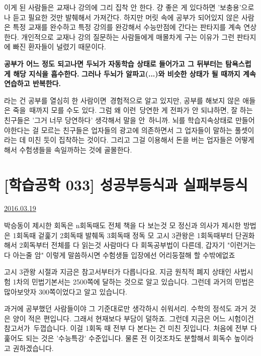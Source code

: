 이게 된 사람들은 교재나 강의에 그리 집착 안 한다. 걍 좋은 게 있다하면 '보충용'으로나 듣고 필요한 것만 발췌해서 가져간다.
하지만 머릿 속에 공부가 되어있지 않은 사람은 특정 교재를 완수하고 특정 강의를 완강해서 수능만점에 간다는 판타지를 계속 연상한다.
개인적으로 교재나 강의 질문하는 사람들에게 매몰차게 구는 이유가 그런 판타지에 빠진 환자들이 널렸기 때문이다.
\vspace{5mm}

\textbf{공부가 어느 정도 되고나면 두뇌가 자동학습 상태로 들어가고 그 뒤부터는 탐욕스럽게 해당 지식을 흡수한다.}
\textbf{그러나 두뇌가 알파고(...)와 비슷한 상태가 될 때까지 계속 연습하고 반복한다.}
\vspace{5mm}

라는 건 공부를 열심히 한 사람이면 경험적으로 알고 있지만, 공부를 해보지 않은 애들은 죽을 때까지 모를 수도 있다.
그럼 왜 이런 당연한 게 전파가 안 되냐하면, 잘 하는 친구들은 '그거 너무 당연하다' 생각해서 말을 안 하니까.
뇌를 학습지속상태로 만들어야한다는 걸 모르는 친구들은
업자들의 광고에 의존하면서 그 업자들이 말하는 풀셋이라는 데 미친 듯이 집착하는 것이다.
그리고 그걸 이용해서 돈을 버는 업자들은 어떻게 해서 수험생들을 속일까하는 것에 골몰한다.
\vspace{5mm}




\section{[학습공학 033] 성공부등식과 실패부등식}
\href{https://www.kockoc.com/Apoc/683846}{2016.03.19}

\vspace{5mm}

박승동이 제시한 회독은 n회독때도 전체 책을 다 보는것 모 정신과 의사가 제시한 방법은 1회독때 겉훑기 2회독때 발췌독 3회독때 정독 모 고시 3관왕은 1회독때부터 단권화해서 2회독부터 전체를 다 읽는것 사람마다 다 회독공부법이 다른데, 갑자기  "이런거는 다 아는줄 암" 이렇게 말씀하시면 수험생들 입장에선 어리둥절해 할 수밖에없죠
\vspace{5mm}

고시 3관왕 시절과 지금은 참고서부터가 다릅니다요.
지금 원칙적 폐지 상태인 사법시험 1차의 민법기본서는 2500쪽에 달하는 것으로 알고 있습니다.
그런데 과거의 민법은 많아보앗자 300쪽이었다고 알고 있습니다.
\vspace{5mm}

과거에 공부했던 사람들이야 그 기준대로만 생각하시 쉬워서리.
수학의 정석도 과거 것은 양이 적은 편입니다. 그래서 현재보다 부담이 덜하죠.
그런데 지금은 어느 시험이건 참고서가 두껍습니다. 이걸 1회독 때 전부 다 본다는 건 미친 짓입니다.
처음에 전부 다 훑어도 되는 것은 '수능특강' 수준입니다. 물론 전 이것조차도 분할해서 회독수 높이라고 권하겠습니다.
\vspace{5mm}


